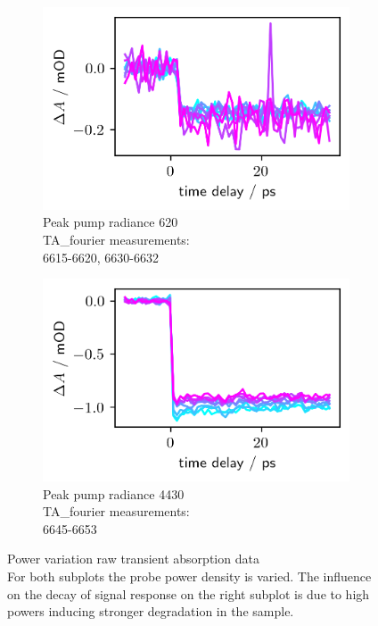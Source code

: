 \documentclass[twoside,openright]{scrreprt}
\begin{document}
\begin{figure}[hbtp]
\centering
\begin{subfigure}[t]{0.45\textwidth}
\centering
\includegraphics[scale=1]{images/PowerVarLowPumpVarProbe.png} 
\caption{Peak pump radiance \SI{620}{\radiance}\\TA\_fourier measurements:\\ 6615-6620, 6630-6632\label{fig:PowerVarL}}
\end{subfigure}
\hfill
\begin{subfigure}[t]{0.45\textwidth}
\centering
\includegraphics[scale=1]{images/PowerVarHighPumpVariedProbe.png} 
\caption{Peak pump radiance \SI{4430}{\radiance}\\TA\_fourier measurements:\\ 6645-6653\label{fig:PowerVarR}}
\end{subfigure}
\caption{Power variation raw transient absorption data\\
For both subplots the probe power density is varied. The influence on the decay of signal response on the right subplot is due to high powers inducing stronger degradation in the sample.}
\end{figure}
\end{document}
